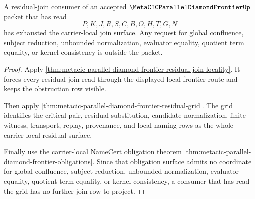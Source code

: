 \begin{theorem}
\label{thm:metacic-parallel-diamond-frontier-residual-join-locality-exhaustion}
A residual-join consumer of an accepted $\MetaCICParallelDiamondFrontierUp$ packet that has read
$$
P,K,J,R,S,C,B,O,H,T,G,N
$$
has exhausted the carrier-local join surface. Any request for global confluence, subject reduction, unbounded normalization, evaluator equality, quotient term equality, or kernel consistency is outside the packet.
\end{theorem}
\begin{proof}
Apply \autoref{thm:metacic-parallel-diamond-frontier-residual-join-locality}. It forces every residual-join read through the displayed local frontier route and keeps the obstruction row visible.

Then apply \autoref{thm:metacic-parallel-diamond-frontier-residual-grid}. The grid identifies the critical-pair, residual-substitution, candidate-normalization, finite-witness, transport, replay, provenance, and local naming rows as the whole carrier-local residual surface.

Finally use the carrier-local NameCert obligation theorem \autoref{thm:metacic-parallel-diamond-frontier-obligations}. Since that obligation surface admits no coordinate for global confluence, subject reduction, unbounded normalization, evaluator equality, quotient term equality, or kernel consistency, a consumer that has read the grid has no further join row to project.
\end{proof}

